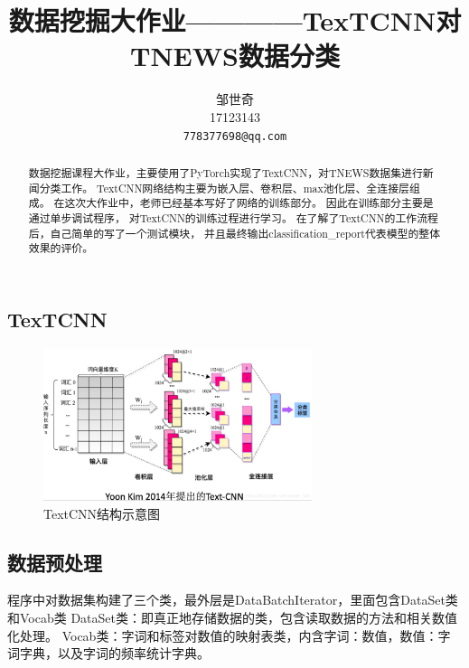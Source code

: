 \documentclass[11pt]{article}
\title{数据挖掘大作业————TexTCNN对TNEWS数据分类}
\author{邹世奇 \\
  17123143\\
  {\tt 778377698@qq.com} \\}
\date{}
\begin{document}
\begin{CJK*}{UTF8}{gbsn}
\setlength{\parindent}{2em}

\maketitle
\begin{abstract}
  数据挖掘课程大作业，主要使用了PyTorch实现了TextCNN，对TNEWS数据集进行新闻分类工作。
  TextCNN网络结构主要为嵌入层、卷积层、max池化层、全连接层组成。
  在这次大作业中，老师已经基本写好了网络的训练部分。
  因此在训练部分主要是通过单步调试程序， 对TextCNN的训练过程进行学习。
  在了解了TextCNN的工作流程后，自己简单的写了一个测试模块，
  并且最终输出classification\_report代表模型的整体效果的评价。
\end{abstract}

\section{TexTCNN}
\label{intro}

%
% 

\begin{figure}[H] %
\centering %
\includegraphics[width=0.7\textwidth]{structure.png} %
\caption{TextCNN结构示意图} %
\label{Fig.main2} %
\end{figure}

\subsection{数据预处理}

程序中对数据集构建了三个类，最外层是DataBatchIterator，里面包含DataSet类和Vocab类
DataSet类：即真正地存储数据的类，包含读取数据的方法和相关数值化处理。
Vocab类：字词和标签对数值的映射表类，内含{字词：数值}，{数值：字词}字典，以及字词的频率统计字典。


\end{CJK*}
\end{document}
